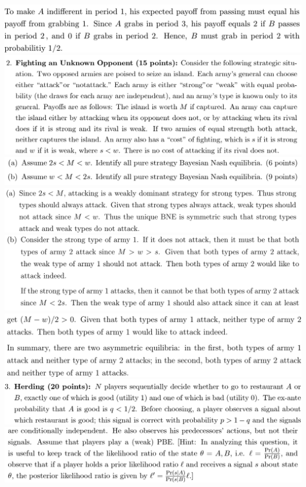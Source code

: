 \documentclass[8pt,landscape]{extarticle}
\begin{document}
\begin{multicols*}{3}
    \includegraphics[width=0.7\linewidth,keepaspectratio]{Screenshots/Screenshot 2024-03-11 172153.png}
    \includegraphics[width=0.78\linewidth,keepaspectratio]{Screenshots/Screenshot 2024-03-11 195345.png}
    \includegraphics[width=0.75\linewidth,keepaspectratio]{Screenshots/Screenshot 2024-03-11 195351.png}
    \includegraphics[width=0.82\linewidth,keepaspectratio]{Screenshots/Screenshot 2024-03-11 195357.png}
    \includegraphics[width=0.82\linewidth,keepaspectratio]{Screenshots/Screenshot 2024-03-11 195400.png}
    \includegraphics[width=0.77\linewidth,keepaspectratio]{Screenshots/Screenshot 2024-03-11 195407.png}
    \includegraphics[width=0.76\linewidth,keepaspectratio]{Screenshots/Screenshot 2024-03-11 195434.png}
    \includegraphics[width=0.76\linewidth,keepaspectratio]{Screenshots/Screenshot 2024-03-11 195437.png}

\end{multicols*}
\end{document}
